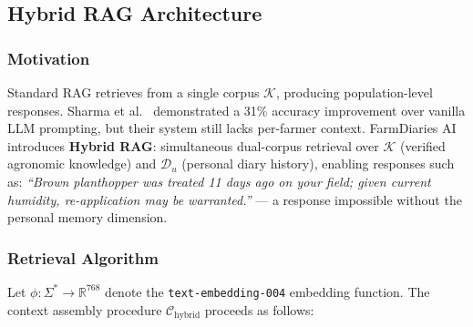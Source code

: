 \documentclass[conference]{IEEEtran}
\begin{document}
\subsection{Hybrid RAG Architecture}
\label{sec:hybrid_rag}

\subsubsection{Motivation}

Standard RAG \cite{lewis2020} retrieves from a single corpus
$\mathcal{K}$, producing population-level responses. Sharma et al.\
\cite{sharma2023} demonstrated a 31\% accuracy improvement over
vanilla LLM prompting, but their system still lacks per-farmer
context. FarmDiaries AI introduces \textbf{Hybrid RAG}: simultaneous
dual-corpus retrieval over $\mathcal{K}$ (verified agronomic knowledge)
and $\mathcal{D}_u$ (personal diary history), enabling responses such
as: \textit{``Brown planthopper was treated 11 days ago on your field;
given current humidity, re-application may be warranted.''} — a
response impossible without the personal memory dimension.

\subsubsection{Retrieval Algorithm}

Let $\phi: \Sigma^* \to \mathbb{R}^{768}$ denote the
\texttt{text-embedding-004} embedding function. The context assembly
procedure $\mathcal{C}_{\mathrm{hybrid}}$ proceeds as follows:
\end{document}
